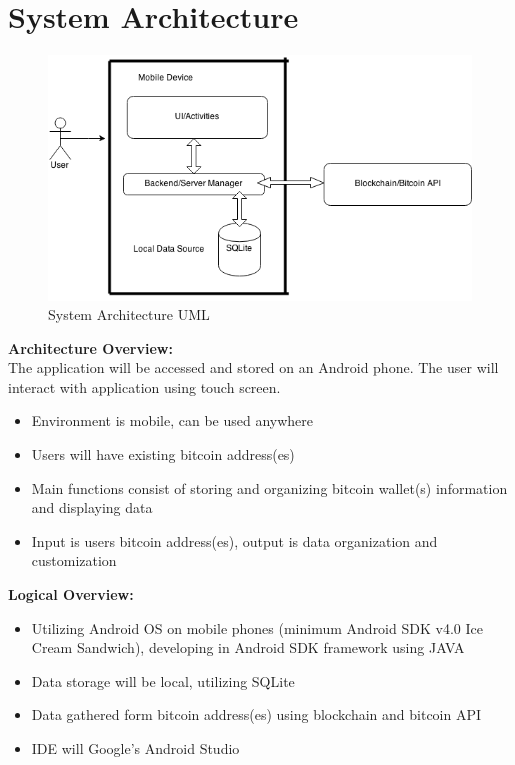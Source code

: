 \section{System Architecture}

\begin{figure}[H]
	\centering
	\includegraphics[scale=0.5]{../diagrams/systemArch.png}
	\caption{System Architecture UML}
\end{figure}

\textbf{Architecture Overview:}\\
The application will be accessed and stored on an Android phone.  The user will interact with application using touch screen.\\
\begin{itemize}
\item Environment is mobile, can be used anywhere 
\item Users will have existing bitcoin address(es)
\item Main functions consist of storing and organizing bitcoin wallet(s) information and displaying data
\item Input is users bitcoin address(es), output is data organization and customization\\
\end{itemize}

\textbf{Logical Overview:}\\

\begin{itemize}
\item Utilizing Android OS on mobile phones (minimum Android SDK v4.0 Ice Cream Sandwich), developing in Android SDK framework using JAVA
\item Data storage will be local, utilizing SQLite
\item Data gathered form bitcoin address(es) using blockchain and bitcoin API
\item IDE will Google's Android Studio\\
\end{itemize}
	
